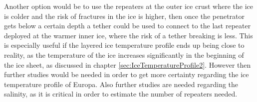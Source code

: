 Another option would be to use the repeaters at the outer ice crust where the ice is colder and the risk of fractures in the ice is higher, then once the penetrator gets below a certain depth a tether could be used to connect to the last repeater deployed at the warmer inner ice, where the risk of a tether breaking is less. This is especially useful if the layered ice temperature profile ends up being close to reality, as the temperature of the ice increases significantly in the beginning of the ice sheet, as discussed in chapter \ref{sec:IceTemperatureProfile2}. However then further studies would be needed in order to get more certainty regarding the ice temperature profile of Europa. Also further studies are needed regarding the salinity, as it is critical in order to estimate the number of repeaters needed.
